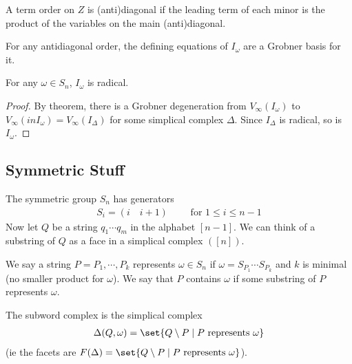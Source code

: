 \begin{definition}
    A term order on $Z$ is (anti)diagonal if the leading term of each minor is the product of the variables on the main (anti)diagonal.
\end{definition}

\begin{theorem}
    For any antidiagonal order, the defining equations of $I_\omega$ are a Grobner basis for it.
\end{theorem}

\begin{corollary}
    For any $\omega \in S_n$, $I_\omega$ is radical.
\end{corollary}

\begin{proof}
    By theorem, there is a Grobner degeneration from $V_\infty (I_\omega) $ to $V_\infty (in I_\omega) = V_\infty (I_\Delta) $ for some simplical complex $\Delta$. Since $I_\Delta$ is radical, so is $I_\omega$.
\end{proof}

\subsection{Symmetric Stuff}

The symmetric group $S_n$ has generators
\begin{align*}
    S_i = (i \quad i+1 ) \qquad \text{ for } 1 \leq i \leq n-1 
\end{align*}
Now let $Q$ be a string $q_1 \cdots q_m$ in the alphabet $[n-1]$. We can think of a substring of $Q$ as a face in a simplical complex $([n])$.

\begin{definition}
    We say a string $P = P_1 , \cdots , P_k$ represents $\omega \in S_n$ if $\omega = S_{P_1} \cdots S_{P_k}$ and $k$ is minimal (no smaller product for $\omega$). We say that $P$ contains $\omega$ if some substring of $P $ represents $\omega$.
\end{definition}

\begin{definition}
    The subword complex is the simplical complex
    \begin{align*}
        \Delta (Q, \omega) = \set{Q \setminus P \mid P \text{ represents } \omega}
    \end{align*}
    (ie the facets are $F(\Delta ) = \set{Q \setminus P \mid P \text{ represents } \omega}$).
\end{definition}

